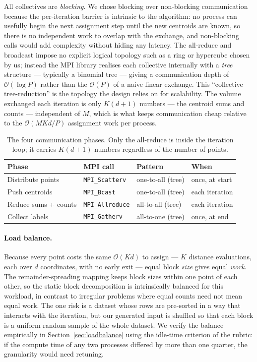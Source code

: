 \documentclass[11pt,a4paper]{article}
\begin{document}
All collectives are \emph{blocking}. We chose blocking over non-blocking
communication because the per-iteration barrier is intrinsic to the algorithm:
no process can usefully begin the next assignment step until the new centroids
are known, so there is no independent work to overlap with the exchange, and
non-blocking calls would add complexity without hiding any latency. The
all-reduce and broadcast impose no explicit logical topology such as a ring or
hypercube chosen by us; instead the MPI library realises each collective
internally with a \emph{tree} structure --- typically a binomial tree --- giving a
communication depth of $\mathcal{O}(\log P)$ rather than the $\mathcal{O}(P)$ of
a naive linear exchange. This ``collective tree-reduction'' is the topology the
design relies on for scalability. The volume exchanged each iteration is only
$K(d+1)$ numbers --- the centroid sums and counts --- independent of $M$, which is
what keeps communication cheap relative to the $\mathcal{O}(MKd/P)$ assignment
work per process.

\begin{table}[H]
\centering
\small
\begin{tabular}{@{}llll@{}}
\toprule
Phase & MPI call & Pattern & When \\
\midrule
Distribute points    & \texttt{MPI\_Scatterv}  & one-to-all (tree)   & once, at start \\
Push centroids       & \texttt{MPI\_Bcast}     & one-to-all (tree)   & each iteration \\
Reduce sums + counts & \texttt{MPI\_Allreduce} & all-to-all (tree)   & each iteration \\
Collect labels       & \texttt{MPI\_Gatherv}   & all-to-one (tree)   & once, at end \\
\bottomrule
\end{tabular}
\caption{The four communication phases. Only the all-reduce is inside the
iteration loop; it carries $K(d+1)$ numbers regardless of the number of points.}
\label{tab:comm}
\end{table}

\paragraph{Load balance.}
Because every point costs the same $\mathcal{O}(Kd)$ to assign --- $K$ distance
evaluations, each over $d$ coordinates, with no early exit --- equal block
\emph{size} gives equal \emph{work}. The remainder-spreading mapping keeps block
sizes within one point of each other, so the static block decomposition is
intrinsically balanced for this workload, in contrast to irregular problems
where equal counts need not mean equal work. The one risk is a dataset whose
rows are pre-sorted in a way that interacts with the iteration, but our generated
input is shuffled so that each block is a uniform random sample of the whole
dataset. We verify the balance empirically in Section~\ref{sec:loadbalance}
using the idle-time criterion of the rubric: if the compute time of any two
processes differed by more than one quarter, the granularity would need
retuning.
\end{document}
